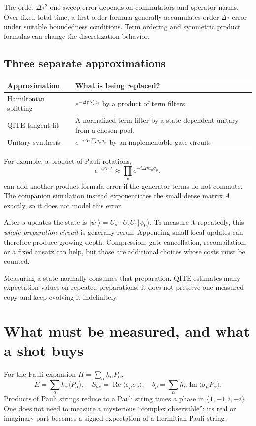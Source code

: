\documentclass[11pt,a4paper]{article}
\newcommand{\ket}[1]{\lvert #1\rangle}
\newcommand{\ex}[1]{\langle #1\rangle}
\newcommand{\Rea}{\operatorname{Re}}
\newcommand{\Ima}{\operatorname{Im}}
\newcommand{\dt}{\Delta\tau}
\newcommand{\lesson}[2]{\clearpage\section{#1}\label{#2}}
\begin{document}
The order-$\dt^2$ one-sweep error depends on commutators and operator norms. Over fixed total time, a first-order formula generally accumulates order-$\dt$ error under suitable boundedness conditions. Term ordering and symmetric product formulas can change the discretization behavior.

\subsection*{Three separate approximations}
\begin{tabularx}{\linewidth}{@{}p{3.1cm}X@{}}
\toprule
Approximation & What is being replaced?\\\midrule
Hamiltonian splitting & $e^{-\dt\sum h_\ell}$ by a product of term filters.\\
QITE tangent fit & A normalized term filter by a state-dependent unitary from a chosen pool.\\
Unitary synthesis & $e^{-i\dt\sum a_\mu\sigma_\mu}$ by an implementable gate circuit.\\\bottomrule
\end{tabularx}

For example, a product of Pauli rotations,
\[
e^{-i\dt A}\approx\prod_\mu e^{-i\dt a_\mu\sigma_\mu},
\]
can add another product-formula error if the generator terms do not commute. The companion simulation instead exponentiates the small dense matrix $A$ exactly, so it does not model this error.

\begin{caution}
After $s$ updates the state is $\ket{\psi_s}=U_s\cdots U_2U_1\ket{\psi_0}$. To measure it repeatedly, this \emph{whole preparation circuit} is generally rerun. Appending small local updates can therefore produce growing depth. Compression, gate cancellation, recompilation, or a fixed ansatz can help, but those are additional choices whose costs must be counted.
\end{caution}

Measuring a state normally consumes that preparation. QITE estimates many expectation values on repeated preparations; it does not preserve one measured copy and keep evolving it indefinitely.

\lesson{What must be measured, and what a shot buys}{sec:measurements}
For the Pauli expansion $H=\sum_\alpha h_\alpha P_\alpha$,
\[
E=\sum_\alpha h_\alpha\ex{P_\alpha},\quad
S_{\mu\nu}=\Rea\ex{\sigma_\mu\sigma_\nu},\quad
b_\mu=\sum_\alpha h_\alpha\Ima\ex{\sigma_\mu P_\alpha}.
\]
Products of Pauli strings reduce to a Pauli string times a phase in $\{1,-1,i,-i\}$. One does not need to measure a mysterious ``complex observable'': its real or imaginary part becomes a signed expectation of a Hermitian Pauli string.
\end{document}
